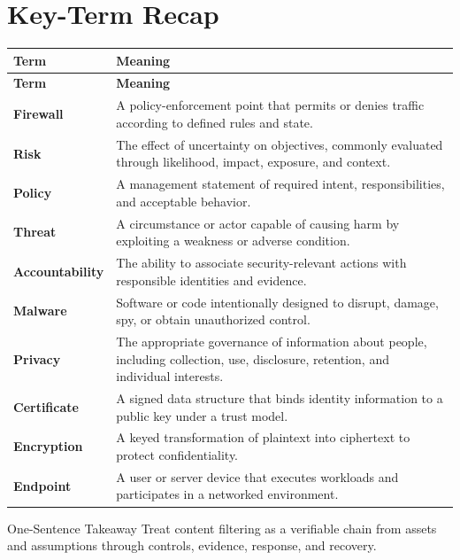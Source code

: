 \documentclass[11pt,letterpaper]{article}
\begin{document}
\section*{Key-Term Recap}
\begin{longtable}{>{\raggedright\arraybackslash}p{}>{\raggedright\arraybackslash}p{}}
\toprule\rowcolor{Navy}\color{white}\textbf{Term} & \color{white}\textbf{Meaning}\\\midrule
\endfirsthead
\toprule\rowcolor{Navy}\color{white}\textbf{Term} & \color{white}\textbf{Meaning}\\\midrule
\endhead
\textbf{Firewall} & A policy-enforcement point that permits or denies traffic according to defined rules and state. \\\midrule
\textbf{Risk} & The effect of uncertainty on objectives, commonly evaluated through likelihood, impact, exposure, and context. \\\midrule
\textbf{Policy} & A management statement of required intent, responsibilities, and acceptable behavior. \\\midrule
\textbf{Threat} & A circumstance or actor capable of causing harm by exploiting a weakness or adverse condition. \\\midrule
\textbf{Accountability} & The ability to associate security-relevant actions with responsible identities and evidence. \\\midrule
\textbf{Malware} & Software or code intentionally designed to disrupt, damage, spy, or obtain unauthorized control. \\\midrule
\textbf{Privacy} & The appropriate governance of information about people, including collection, use, disclosure, retention, and individual interests. \\\midrule
\textbf{Certificate} & A signed data structure that binds identity information to a public key under a trust model. \\\midrule
\textbf{Encryption} & A keyed transformation of plaintext into ciphertext to protect confidentiality. \\\midrule
\textbf{Endpoint} & A user or server device that executes workloads and participates in a networked environment. \\\midrule
\bottomrule
\end{longtable}
\begin{CornellExamBox}{One-Sentence Takeaway}
Treat content filtering as a verifiable chain from assets and assumptions through controls, evidence, response, and recovery.
\end{CornellExamBox}
\end{document}
